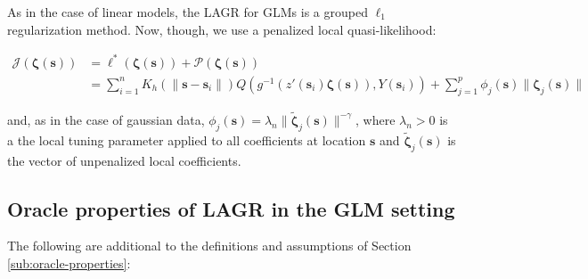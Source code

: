 \documentclass[12pt,english,authoryear, review]{article}\usepackage[]{graphicx}\usepackage[]{color}
\theoremstyle{plain}
\theoremstyle{plain}
\begin{document}
As in the case of linear models, the LAGR for GLMs is a grouped $\ell_{1}$
regularization method. Now, though, we use a penalized local quasi-likelihood:

\begin{align}
\mathcal{J}\left(\bm{\zeta}(\bm{s})\right) & =\mathcal{\ell}^{*}\left(\bm{\zeta}(\bm{s})\right)+\mathcal{P}\left(\bm{\zeta}(\bm{s})\right)\label{eq:adaptive-lasso-GLLM}\\
 & =\sum_{i=1}^{n}K_{h}\left(\|\bm{s}-\bm{s}_{i}\|\right)Q\left(g^{-1}\left(z'(\bm{s}_{i})\bm{\zeta}(\bm{s})\right),Y(\bm{s}_{i})\right)+\sum_{j=1}^{p}\phi_{j}\left(\bm{s}\right)\|\bm{\zeta}_{j}\left(\bm{s}\right)\|
\end{align}


and, as in the case of gaussian data, $\phi_{j}\left(\bm{s}\right)=\lambda_{n}\|\tilde{\bm{\zeta}}_{j}\left(\bm{s}\right)\|^{-\gamma}$,
where $\lambda_{n}>0$ is a the local tuning parameter applied to
all coefficients at location $\bm{s}$ and $\tilde{\bm{\zeta}}_{j}\left(\bm{s}\right)$
is the vector of unpenalized local coefficients.


\subsection{Oracle properties of LAGR in the GLM setting}

The following are additional to the definitions and assumptions of
Section \ref{sub:oracle-properties}:
\end{document}
